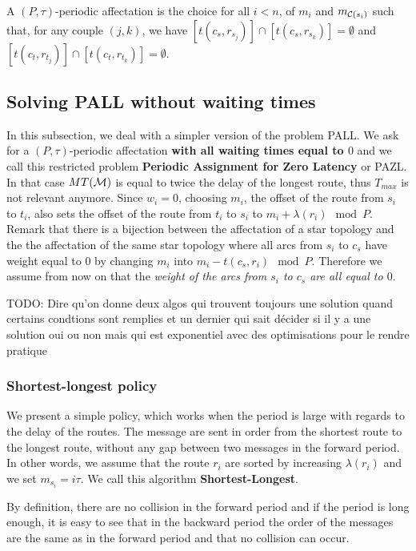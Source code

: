 \documentclass[a4paper,10pt]{article}
\newcommand{\todo}[1]{{\color{red} TODO: {#1}}}
\begin{document}
      A $(P,\tau)$-periodic affectation is the choice for all $i < n$, of $m_i$ and $m_{{\cal C}(s_i)}$ such that, for any couple $(j,k)$, we have $[t(c_s,r_{s_{j}})] \cap [t(c_s,r_{s_k})] = \emptyset$ and $[t(c_t,r_{t_j})] \cap [t(c_t,r_{t_k})] = \emptyset$.

      

  \subsection{Solving PALL without waiting times}
  
  In this subsection, we deal with a simpler version of the problem PALL.
  We ask for a $(P,\tau)$-periodic affectation {\bf with all waiting times equal to $0$} and we call this restricted problem {\bf Periodic Assignment for Zero Latency} or PAZL. 
  In that case $MT({\cal M})$ is equal to twice the delay of the longest route, thus $T_{max}$ is not relevant anymore. 
  Since $w_i=0$, choosing $m_i$, the offset of the route from $s_i$ to $t_i$, also sets the offset of the route from $t_i$ to $s_i$ to $m_i + \lambda(r_i) \mod P$.
  Remark that there is a bijection between the affectation of a star topology and the 
  the affectation of the same star topology where all arcs from $s_i$ to $c_s$ have weight equal to $0$
  by changing $m_i$ into $m_i - t(c_s,r_i) \mod P$. Therefore we assume from now on that the \emph{weight of the arcs from $s_i$ to $c_s$ are all equal to $0$}.
  
  \todo{Dire qu'on donne deux algos qui trouvent toujours une solution quand certains condtions sont remplies
  et un dernier qui sait décider si il y a une solution oui ou non mais qui est exponentiel avec des optimisations pour le rendre pratique}
  
    \subsubsection{Shortest-longest policy}
    

    
    We present a simple policy, which works when the period is large with regards to the delay of the routes.
    The message are sent in order from the shortest route to the longest route, without any gap between two messages in the forward period.
    In other words, we assume that the route $r_i$ are sorted by increasing $\lambda(r_i)$ and we set $m_{s_i} = i\tau$.
    We call this algorithm {\bf Shortest-Longest}.
      
     By definition, there are no collision in the forward period and if the period is long enough, 
     it is easy to see that in the backward period the order of the messages are the same as in the forward period and that no collision can occur. 
      
\end{document}
